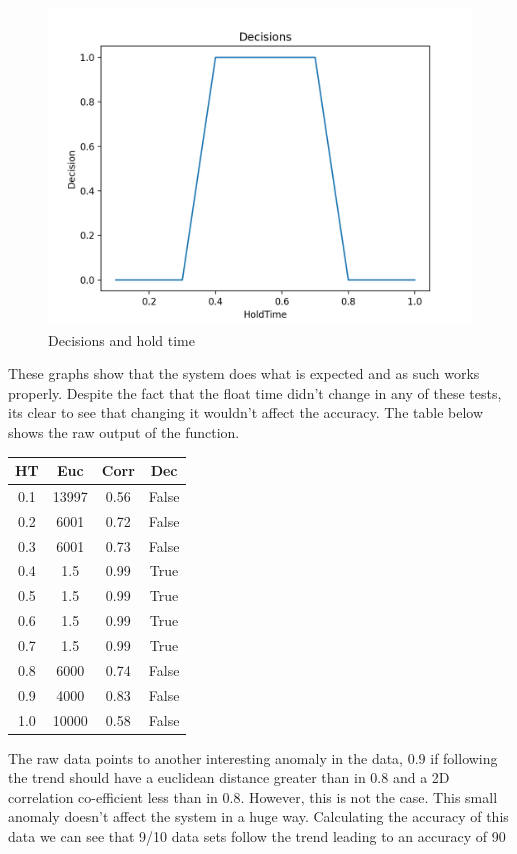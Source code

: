 \documentclass[10pt,a4paper]{report}
\begin{document}
\begin{figure}
	\centering
	\includegraphics[scale=0.6]{DecisionsGraph}
	\caption{Decisions and hold time}
	\label{fig:decGraph}
\end{figure}

These graphs show that the system does what is expected and as such works properly. Despite the fact that the float time didn't change in any of these tests, its clear to see that changing it wouldn't affect the accuracy. The table below shows the raw output of the function.

\begin{center}
	\begin{tabular}{|c|c|c|c|}
	\hline
	HT & Euc & Corr & Dec \\ [0.5ex]
	\hline
	\hline
	0.1 & 13997 & 0.56 & False \\
	0.2 & 6001 & 0.72 & False \\
	0.3 & 6001 & 0.73 & False \\
	0.4 & 1.5 & 0.99 & True \\
	0.5 & 1.5 & 0.99 & True \\
	0.6 & 1.5 & 0.99 & True \\
	0.7 & 1.5 & 0.99 & True \\
	0.8 & 6000 & 0.74 & False \\
	0.9 & 4000 & 0.83 & False \\
	1.0 & 10000 & 0.58 & False \\
	\hline
	\end{tabular}
\end{center}

The raw data points to another interesting anomaly in the data, \(0.9\) if following the trend should have a euclidean distance greater than in \(0.8\) and a 2D correlation co-efficient less than in \(0.8\). However, this is not the case. This small anomaly doesn't affect the system in a huge way. Calculating the accuracy of this data we can see that 9/10 data sets follow the trend leading to an accuracy of 90%
\end{document}
